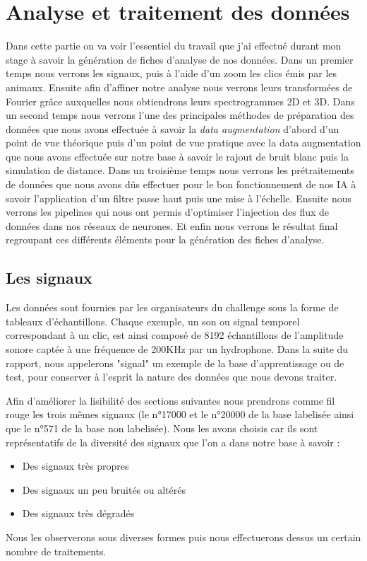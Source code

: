 
\hypertarget{Analyse-et-traitement-des-donnuxe9es}{%
\chapter{Analyse et traitement des données}\label{Analyse-et-traitement-des-donnuxe9es}}

Dans cette partie on va voir l'essentiel du travail que j'ai effectué durant mon stage à savoir la génération de fiches d'analyse de nos données. Dans un premier temps nous verrons les signaux, puis à l'aide d'un zoom les clics émis par les animaux. Ensuite afin d'affiner notre analyse nous verrons leurs transformées de Fourier grâce auxquelles nous obtiendrons leurs spectrogrammes 2D et 3D. Dans un second temps nous verrons l'une des principales méthodes de préparation des données que nous avons effectuée à savoir la \textit{data augmentation} d'abord d'un point de vue théorique puis d'un point de vue pratique avec la data augmentation que nous avons effectuée sur notre base à savoir le rajout de bruit blanc puis la simulation de distance. Dans un troisième temps nous verrons les prétraitements de données que nous avons dûs effectuer pour le bon fonctionnement de nos IA à savoir l'application d'un filtre passe haut puis une mise à l'échelle. Ensuite nous verrons les pipelines qui nous ont permis d'optimiser l'injection des flux de données dans nos réseaux de neurones. Et enfin nous verrons le résultat final regroupant ces différents éléments pour la génération des fiches d'analyse.

\hypertarget{Les-signaux}{%
\section{Les signaux}
\label{Les-signaux}}
Les données sont fournies par les organisateurs du challenge sous la forme de tableaux d'échantillons. Chaque exemple, un son ou signal temporel correspondant à un clic, est ainsi composé de
8192 échantillons de l'amplitude sonore captée à une fréquence de 200KHz par un hydrophone.
Dans la suite du rapport, nous appelerons "signal" un exemple de la base d'apprentissage ou de test, pour conserver à l'esprit la nature des données que nous devons traiter.

Afin d'améliorer la lisibilité des sections suivantes nous prendrons comme fil rouge les trois mêmes signaux (le n°17000 et le n°20000 de la base labelisée ainsi que le n°571 de la base non labelisée).
Nous les avons choisis car ils sont représentatifs de la diversité des signaux que l'on a dans notre base à savoir :
\begin{itemize}
\item Des signaux très propres
\item Des signaux un peu bruités ou altérés
\item Des signaux très dégradés
\end{itemize}
Nous les observerons sous diverses formes puis nous effectuerons dessus un certain nombre de traitements.

